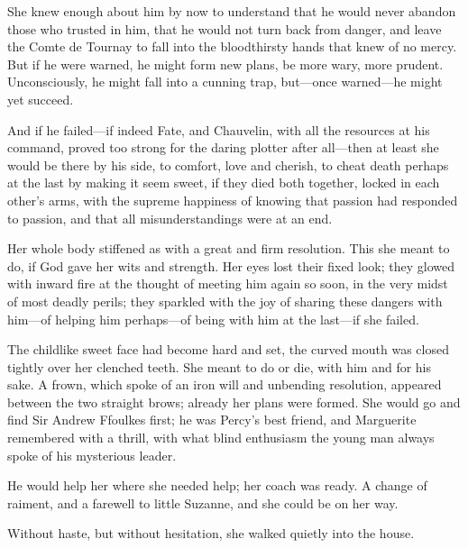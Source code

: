 She knew enough about him by now to understand that he would never abandon those who trusted in him, that he would not turn back from danger, and leave the Comte de Tournay to fall into the bloodthirsty hands that knew of no mercy. But if he were warned, he might form new plans, be more wary, more prudent. Unconsciously, he might fall into a cunning trap, but---once warned---he might yet succeed.

And if he failed---if indeed Fate, and Chauvelin, with all the resources at his command, proved too strong for the daring plotter after all---then at least she would be there by his side, to comfort, love and cherish, to cheat death perhaps at the last by making it seem sweet, if they died both together, locked in each other's arms, with the supreme happiness of knowing that passion had responded to passion, and that all misunderstandings were at an end.

Her whole body stiffened as with a great and firm resolution. This she meant to do, if God gave her wits and strength. Her eyes lost their fixed look; they glowed with inward fire at the thought of meeting him again so soon, in the very midst of most deadly perils; they sparkled with the joy of sharing these dangers with him---of helping him perhaps---of being with him at the last---if she failed.

The childlike sweet face had become hard and set, the curved mouth was closed tightly over her clenched teeth. She meant to do or die, with him and for his sake. A frown, which spoke of an iron will and unbending resolution, appeared between the two straight brows; already her plans were formed. She would go and find Sir Andrew Ffoulkes first; he was Percy's best friend, and Marguerite remembered with a thrill, with what blind enthusiasm the young man always spoke of his mysterious leader.

He would help her where she needed help; her coach was ready. A change of raiment, and a farewell to little Suzanne, and she could be on her way.

Without haste, but without hesitation, she walked quietly into the house.